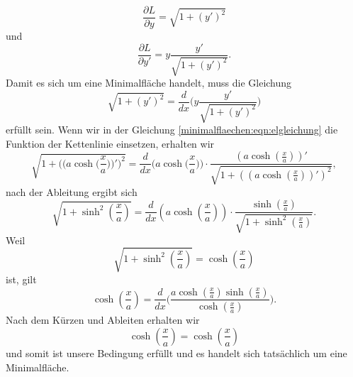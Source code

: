 \begin{equation}
	\frac{\partial L}{\partial y} = \sqrt{1 + (y')^2}
\end{equation}
und 
\begin{equation}
	\frac{\partial L}{\partial y'} = y \frac{y'}{\sqrt{1 + (y')^2}}.
\end{equation}
Damit es sich um eine Minimalfläche handelt, muss die Gleichung
\begin{equation}
	\sqrt{1 + (y')^2} = \frac{d}{dx} \biggl( y \frac{y'}{\sqrt{1 + (y')^2}} \biggr)
	\label{minimalflaechen:eqn:elgleichung}
\end{equation}
erfüllt sein.
Wenn wir in der Gleichung \eqref{minimalflaechen:eqn:elgleichung}  die Funktion der Kettenlinie einsetzen, erhalten wir 
\begin{equation}
	\sqrt{1 + \biggl( \biggl( a \cosh \biggl( \frac{x}{a} \biggr) \biggr)' \biggr)^2 }
=
\frac{d}{dx} \biggl( a \cosh \biggl( \frac{x}{a} \biggr) \biggr)
\cdot
\frac{\left( a \cosh \left( \frac{x}{a} \right) \right)'}{\sqrt{1 + \left( \left( a \cosh \left( \frac{x}{a} \right) \right)' \right)^2 }},
\end{equation}
nach der Ableitung ergibt sich 
\begin{equation}
\sqrt{1 + \sinh^2 \left( \frac{x}{a} \right)}
=
\frac{d}{dx}  \left( a \cosh \left( \frac{x}{a} \right) \right) \cdot \frac{\sinh \left( \frac{x}{a} \right)}{\sqrt{1 + \sinh^2 \left( \frac{x}{a} \right)}}.
\end{equation}
Weil
\begin{equation}
	\sqrt{1 + \sinh^2 \left( \frac{x}{a} \right)} = \cosh \left( \frac{x}{a} \right)
\end{equation}
ist, gilt 
\begin{equation}
\cosh \left( \frac{x}{a} \right)
=
\frac{d}{dx} \biggl( \frac{a \cosh \left( \frac{x}{a} \right) \sinh \left( \frac{x}{a} \right)}{\cosh \left( \frac{x}{a} \right)} \biggr).
\end{equation}	
Nach dem Kürzen und Ableiten erhalten wir 
\begin{equation}
	\cosh \left( \frac{x}{a} \right) = \cosh \left( \frac{x}{a} \right)
\end{equation}	
%
und somit ist unsere Bedingung erfüllt und es handelt sich tatsächlich um eine Minimalfläche. 
